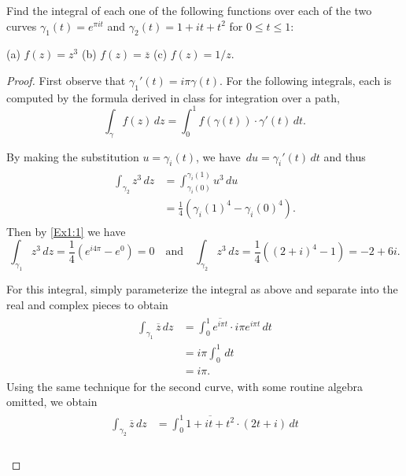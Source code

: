 \documentclass[10pt]{amsart}
\begin{document}
\begin{thm}
  \label{Ex1}
  Find the integral of each one of the following functions over each of the two curves
  $\gamma_1(t) = e^{\pi i t}$ and $\gamma_2(t) = 1 + it + t^2$ for $0 \le t \le 1$:
\item\item{(a)}
  $f(z) = z^3$ \qquad\qquad  (b) $f(z) = \overline z$ \qquad\qquad  (c) $f(z) = 1/z$.
  \begin{proof}
    First observe that $\gamma_1'(t) = i\pi\gamma(t)$.
    For the following integrals, each is computed by the formula derived in class for integration over a path, 
    \begin{equation}
      \label{Ex1:1}
      \int_{\gamma} f(z)\,dz = \int_0^1f(\gamma(t))\cdot\gamma'(t)\,dt.
    \end{equation}
    \begin{alphaenum}
    \item
      By making the substitution $u = \gamma_i(t)$, we have $\,du = \gamma_i'(t)\,dt$ and thus
      \begin{align*}
        \begin{split}
          \int_{\gamma_2}z^3\,dz &= \int_{\gamma_i(0)}^{\gamma_i(1)}u^3\,du\\
          &= \frac{1}{4}(\gamma_i(1)^4 - \gamma_i(0)^4).
        \end{split}
      \end{align*}
      Then by \eqref{Ex1:1} we have
      $$\int_{\gamma_1} z^3\,dz = \frac{1}{4}(e^{i4\pi} - e^0) = 0 \quad \text{and} \quad \int_{\gamma_2}z^3\,dz = \frac{1}{4}((2+i)^4 - 1) = -2 + 6i.$$
    \item
      For this integral, simply parameterize the integral as above and separate into the real and complex pieces to obtain
      \begin{align*}
        \begin{split}
          \int_{\gamma_1} \overline{z}\,dz &= \int_0^1\overline{e^{i\pi t}}\cdot i\pi e^{i\pi t}\,dt\\
          &= i\pi \int_0^1 \,dt\\
          &= i\pi.
        \end{split}
      \end{align*}
      Using the same technique for the second curve, with some routine algebra omitted, we obtain
      \begin{align*}
        \begin{split}
          \int_{\gamma_2}\overline{z}\,dz &= \int_0^1 \overline{1 + it + t^2}\cdot(2t+i)\,dt\\

\end{split}
\end{align*}
\end{alphaenum}
\end{proof}
\end{thm}
\end{document}
